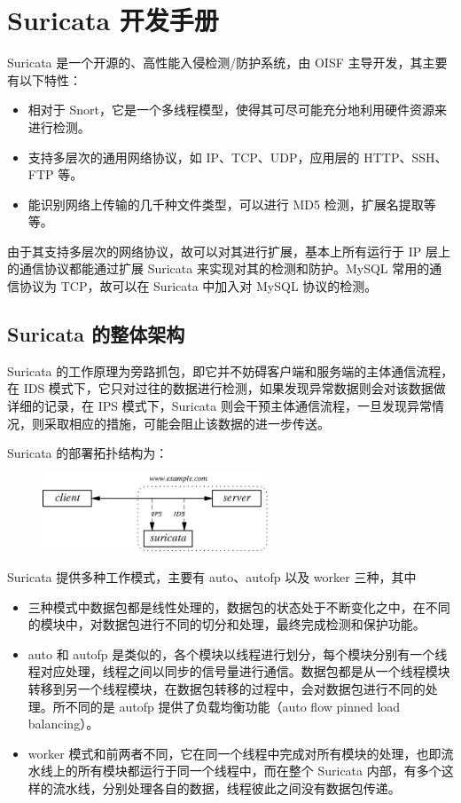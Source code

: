 \chapter{Suricata 开发手册}

Suricata 是一个开源的、高性能入侵检测/防护系统，由 OISF 主导开发，其主要有以下特性：

\begin{itemize}
    \item 相对于 Snort，它是一个多线程模型，使得其可尽可能充分地利用硬件资源来进行检测。
    \item 支持多层次的通用网络协议，如 IP、TCP、UDP，应用层的 HTTP、SSH、FTP 等。
    \item 能识别网络上传输的几千种文件类型，可以进行 MD5 检测，扩展名提取等等。
\end{itemize}

由于其支持多层次的网络协议，故可以对其进行扩展，基本上所有运行于 IP 层上的通信协议都能通过扩展 Suricata 来实现对其的检测和防护。MySQL 常用的通信协议为 TCP，故可以在 Suricata 中加入对 MySQL 协议的检测。

\section{Suricata 的整体架构}
Suricata 的工作原理为旁路抓包，即它并不妨碍客户端和服务端的主体通信流程，在 IDS 模式下，它只对过往的数据进行检测，如果发现异常数据则会对该数据做详细的记录，在 IPS 模式下，Suricata 则会干预主体通信流程，一旦发现异常情况，则采取相应的措施，可能会阻止该数据的进一步传送。

Suricata 的部署拓扑结构为：

\begin{figure}[ht!]
    \centering
    \includegraphics[width=0.6\textwidth]{ids-ips.eps}
\end{figure}

Suricata 提供多种工作模式，主要有 {\cf auto}、{\cf autofp} 以及 {\cf worker} 三种，其中
\begin{itemize}
    \item 三种模式中数据包都是线性处理的，数据包的状态处于不断变化之中，在不同的模块中，对数据包进行不同的切分和处理，最终完成检测和保护功能。
    \item {\cf auto} 和 {\cf autofp} 是类似的，各个模块以线程进行划分，每个模块分别有一个线程对应处理，线程之间以同步的信号量进行通信。数据包都是从一个线程模块转移到另一个线程模块，在数据包转移的过程中，会对数据包进行不同的处理。所不同的是 {\cf autofp} 提供了负载均衡功能（{\ef auto flow pinned load balancing}）。
    \item {\cf worker} 模式和前两者不同，它在同一个线程中完成对所有模块的处理，也即流水线上的所有模块都运行于同一个线程中，而在整个 Suricata 内部，有多个这样的流水线，分别处理各自的数据，线程彼此之间没有数据包传递。
\end{itemize}

